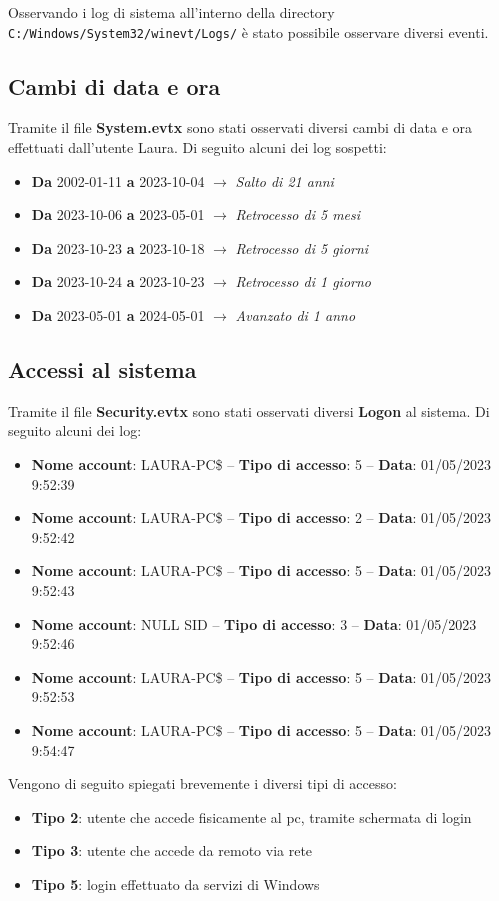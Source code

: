 Osservando i log di sistema all'interno della directory\\
\texttt{C:/Windows/System32/winevt/Logs/} è stato possibile osservare diversi eventi.

\subsection{Cambi di data e ora}
Tramite il file \textbf{System.evtx} sono stati osservati diversi cambi di data e ora effettuati dall'utente Laura. Di seguito alcuni dei log sospetti:
\begin{itemize}
    \item \textbf{Da} 2002-01-11 \textbf{a} 2023-10-04 $\rightarrow$ \textit{Salto di 21 anni}
    \item \textbf{Da} 2023-10-06 \textbf{a} 2023-05-01 $\rightarrow$ \textit{Retrocesso di 5 mesi}
    \item \textbf{Da} 2023-10-23 \textbf{a} 2023-10-18 $\rightarrow$ \textit{Retrocesso di 5 giorni}
    \item \textbf{Da} 2023-10-24 \textbf{a} 2023-10-23 $\rightarrow$ \textit{Retrocesso di 1 giorno}
    \item \textbf{Da} 2023-05-01 \textbf{a} 2024-05-01 $\rightarrow$ \textit{Avanzato di 1 anno}
\end{itemize}

\subsection{Accessi al sistema}
Tramite il file \textbf{Security.evtx} sono stati osservati diversi \textbf{Logon} al sistema. Di seguito alcuni dei log:
\begin{itemize}
    \item \textbf{Nome account}: LAURA-PC\$ -- \textbf{Tipo di accesso}: 5 -- \textbf{Data}: 01/05/2023 9:52:39
    \item \textbf{Nome account}: LAURA-PC\$ -- \textbf{Tipo di accesso}: 2 -- \textbf{Data}: 01/05/2023 9:52:42
    \item \textbf{Nome account}: LAURA-PC\$ -- \textbf{Tipo di accesso}: 5 -- \textbf{Data}: 01/05/2023 9:52:43
    \item \textbf{Nome account}: NULL SID -- \textbf{Tipo di accesso}: 3 -- \textbf{Data}: 01/05/2023 9:52:46
    \item \textbf{Nome account}: LAURA-PC\$ -- \textbf{Tipo di accesso}: 5 -- \textbf{Data}: 01/05/2023 9:52:53
    \item \textbf{Nome account}: LAURA-PC\$ -- \textbf{Tipo di accesso}: 5 -- \textbf{Data}: 01/05/2023 9:54:47
\end{itemize}
Vengono di seguito spiegati brevemente i diversi tipi di accesso:
\begin{itemize}
    \item \textbf{Tipo 2}: utente che accede fisicamente al pc, tramite schermata di login
    \item \textbf{Tipo 3}: utente che accede da remoto via rete
    \item \textbf{Tipo 5}: login effettuato da servizi di Windows
\end{itemize}